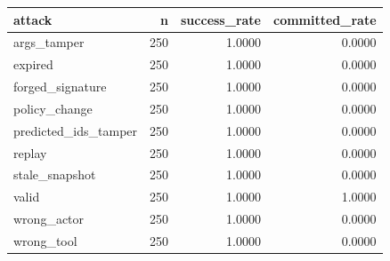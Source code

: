 \begin{tabular}{lrrr}
\toprule
attack & n & success_rate & committed_rate \\
\midrule
args_tamper & 250 & 1.0000 & 0.0000 \\
expired & 250 & 1.0000 & 0.0000 \\
forged_signature & 250 & 1.0000 & 0.0000 \\
policy_change & 250 & 1.0000 & 0.0000 \\
predicted_ids_tamper & 250 & 1.0000 & 0.0000 \\
replay & 250 & 1.0000 & 0.0000 \\
stale_snapshot & 250 & 1.0000 & 0.0000 \\
valid & 250 & 1.0000 & 1.0000 \\
wrong_actor & 250 & 1.0000 & 0.0000 \\
wrong_tool & 250 & 1.0000 & 0.0000 \\
\bottomrule
\end{tabular}

